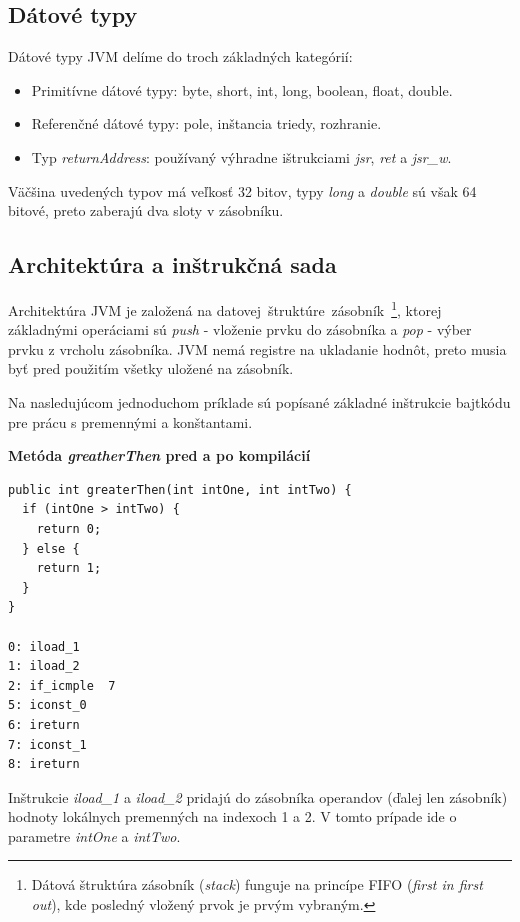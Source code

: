\documentclass[11pt,final,oneside]{fithesis}
\newenvironment{example}[1]
{
\vspace{3mm}
\noindent\textbf{#1}
\vspace{2mm}
}
{
\vspace{3mm}
}
\begin{document}
\subsection{Dátové typy}
Dátové typy JVM delíme do troch základných
kategórií:

\begin{itemize}
\item Primitívne dátové typy: byte, short, int, long, boolean, float, double.
\item Referenčné dátové typy: pole, inštancia triedy, rozhranie.
\item Typ \textit{returnAddress}: používaný výhradne ištrukciami
\textit{jsr}, \textit{ret} a \textit{jsr\_w}.
\end{itemize}

Väčšina uvedených typov má veľkosť 32 bitov, typy \textit{long} a
\textit{double} sú však 64 bitové, preto zaberajú dva sloty v zásobníku.

\subsection{Architektúra a inštrukčná sada}
Architektúra JVM je založená na datovej~štruktúre~zásobník~\footnote{Dátová
štruktúra zásobník (\textit{stack}) funguje na princípe FIFO (\textit{first in
first out}), kde posledný vložený prvok je prvým vybraným.}, ktorej základnými
operáciami sú \textit{push} - vloženie prvku do zásobníka a \textit{pop} - výber
prvku z vrcholu zásobníka. JVM nemá registre na ukladanie hodnôt, preto musia
byť pred použitím všetky uložené na zásobník.

Na nasledujúcom jednoduchom príklade sú popísané základné inštrukcie bajtkódu
pre prácu s premennými a konštantami.

\begin{example}{Metóda \textit{greatherThen} pred a po kompilácií}
\begin{verbatim}
public int greaterThen(int intOne, int intTwo) {
  if (intOne > intTwo) {
    return 0;
  } else {
    return 1;
  }
}

0: iload_1
1: iload_2
2: if_icmple  7
5: iconst_0
6: ireturn
7: iconst_1
8: ireturn
\end{verbatim}
\end{example}

Inštrukcie \textit{iload\_1} a \textit{iload\_2} pridajú do zásobníka operandov 
(ďalej len zásobník) hodnoty lokálnych premenných na indexoch 1 a 2. V tomto 
prípade ide o parametre \textit{intOne} a \textit{intTwo}. 
\end{document}
